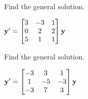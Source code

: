 \documentclass{ximera}
\begin{document}
 \begin{problem}\label{exer:10.6.5}  
 Find the general solution.
 
 $ {\bf
y}'= \begin{bmatrix}3&-3&1\\0&2&2\\5&1&1\end{bmatrix}{\bf y}$
\end{problem}

 \begin{problem}\label{exer:10.6.6}
 Find the general solution.
 
 $ {\bf
y}'= \begin{bmatrix}-3&3&1\\1&-5&-3\\-3&7&3\end{bmatrix}{\bf y}$


\end{problem}
\end{document}
